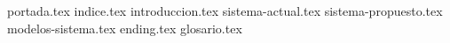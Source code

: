 \documentclass[12pt]{article}
\begin{document}
{portada.tex}
{indice.tex}
{introduccion.tex}
{sistema-actual.tex}
{sistema-propuesto.tex}
{modelos-sistema.tex}
{ending.tex}
{glosario.tex}
\end{document}
